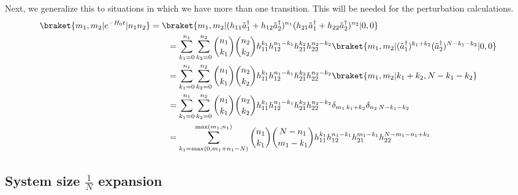 Next, we generalize this to situations in which we have more than one transition.  This will be needed for the perturbation calculations.
\begin{align}
\braket{ m_1, m_2 | e^{-H_0 t} | n_1 n_2 } &= 
\braket{ m_1, m_2 | (h_{11} {\tilde a}_1^\dagger +
                     h_{12} {\tilde a}_2^\dagger)^{n_1}
                    (h_{21} {\tilde a}_1^\dagger +
                     h_{22} {\tilde a}_2^\dagger)^{n_2}
 | 0, 0} \\ &\qquad=
\sum_{k_1 = 0}^{n_1} \sum_{k_2 = 0}^{n_2}
 {n_1 \choose k_1} {n_2 \choose k_2}
 h_{11}^{k_1} h_{12}^{n_1 - k_1}
 h_{21}^{k_2} h_{22}^{n_2 - k_2}
 \braket{ m_1, m_2 |
  ({\tilde a}_1^{\dagger})^{k_1 + k_2}
  ({\tilde a}_2^\dagger)^{N - k_1 - k_2} | 0, 0 } \\ &\qquad=
\sum_{k_1 = 0}^{n_1} \sum_{k_2 = 0}^{n_2}
 {n_1 \choose k_1} {n_2 \choose k_2}
 h_{11}^{k_1} h_{12}^{n_1 - k_1}
 h_{21}^{k_2} h_{22}^{n_2 - k_2}
 \braket{ m_1, m_2 | k_1 + k_2, N - k_1 - k_2 } \\ &\qquad=
\sum_{k_1 = 0}^{n_1} \sum_{k_2 = 0}^{n_2}
 {n_1 \choose k_1} {n_2 \choose k_2}
 h_{11}^{k_1} h_{12}^{n_1 - k_1}
 h_{21}^{k_2} h_{22}^{n_2 - k_2}
 \delta_{m_1 \, k_1 + k_2} \delta_{n_2 \, N - k_1 - k_2} \\
&\qquad= \sum_{k_1 = \max (0, m_1 + n_1 - N)}^{\max (m_1, n_1)}
 {n_1 \choose k_1} {N - n_1 \choose m_1 - k_1}
 h_{11}^{k_1} h_{12}^{n_1 - k_1}
 h_{21}^{m_1 - k_1} h_{22}^{N - m_1 - n_1 + k_1}
\end{align}



\subsection{System size $\frac{1}{N}$ expansion}
